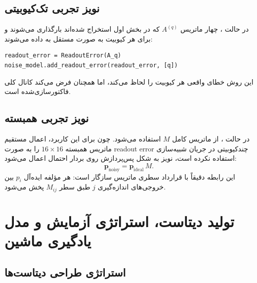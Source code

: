 \subsection{نویز تجربی تک‌کیوبیتی}

در حالت ، چهار ماتریس $A^{(q)}$ که در بخش اول استخراج شده‌اند بارگذاری می‌شوند و برای هر کیوبیت به صورت مستقل به  داده می‌شوند:
\begin{latin}
\begin{verbatim}
readout_error = ReadoutError(A_q)
noise_model.add_readout_error(readout_error, [q])
\end{verbatim}
\end{latin}
این روش خطای واقعی هر کیوبیت را لحاظ می‌کند، اما همچنان فرض می‌کند کانال کلی فاکتورسازی‌شده است.

\subsection{نویز تجربی همبسته}

در حالت ، از ماتریس کامل $M$ استفاده می‌شود. چون  برای این کاربرد، اعمال مستقیم ماتریس همبسته $16\times16$ را به صورت readout error چندکیوبیتی در جریان شبیه‌سازی استفاده نکرده است، نویز به شکل پس‌پردازش روی بردار احتمال اعمال می‌شود:
\begin{equation}
	\mathbf{p}_{\mathrm{noisy}}
	=
	\mathbf{p}_{\mathrm{ideal}}\,M.
	\label{eq:correlated-application}
\end{equation}
این رابطه دقیقاً با قرارداد سطری ماتریس سازگار است: هر مؤلفه ایده‌آل $p_i$ بین خروجی‌های اندازه‌گیری $j$ طبق سطر $M_{ij}$ پخش می‌شود.

\section{تولید دیتاست، استراتژی آزمایش و مدل یادگیری ماشین}

\subsection{استراتژی طراحی دیتاست‌ها}

